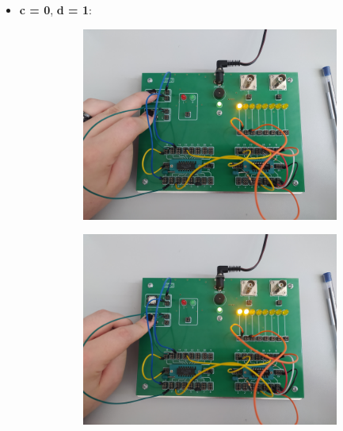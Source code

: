 \begin{itemize}
\pagebreak

    \item \textbf{c = 0}, \textbf{d = 1}:
        \begin{figure}[H]
            \centering
            \begin{subfigure}[H]{0.4\textwidth}
                \includegraphics[width=\textwidth]{img/synch_RS/1653500525344_scaled.png}
            \end{subfigure}
            \begin{subfigure}[H]{0.4\textwidth}
                \includegraphics[width=\textwidth]{img/synch_RS/1653500525359_scaled.png}
            \end{subfigure}
        \end{figure}


\end{itemize}
